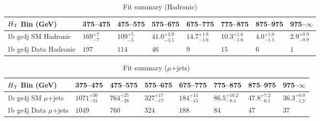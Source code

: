 \documentclass[8pt]{article}
\def\scalht{\mbox{$H_{\rm{T}}$}\xspace}
\newcommand\T{\rule{0pt}{2.6ex}}
\begin{document}
\begin{table}[ht!]
\caption{Fit summary (Hadronic)}
\label{tab:ensemble-summary}
\centering
\begin{tabular}{ llllllll }

\hline
\scalht Bin (GeV)       & 375--475                       & 475--575                       & 575--675                       & 675--775                       & 775--875                       & 875--975                       & 975--$\infty$                  \\ [1.000000ex]
\hline
1b ge4j SM Hadronic\T   & $169^{+7}_{-7}$                & $109^{+5}_{-5}$                & $41.0^{+3.9}_{-3.5}$           & $14.7^{+1.8}_{-1.6}$           & $10.3^{+1.6}_{-1.6}$           & $4.0^{+1.0}_{-1.1}$            & $2.9^{+0.9}_{-0.9}$            \\ 
1b ge4j Data Hadronic\T & $197$                          & $114$                          & $46$                           & $9$                            & $15$                           & $6$                            & $1$                            \\ 
\hline

\end{tabular}
\end{table}
\begin{table}[ht!]
\caption{Fit summary ($\mu$+jets)}
\label{tab:ensemble-summary}
\centering
\begin{tabular}{ llllllll }

\hline
\scalht Bin (GeV)       & 375--475                       & 475--575                       & 575--675                       & 675--775                       & 775--875                       & 875--975                       & 975--$\infty$                  \\ [1.000000ex]
\hline
1b ge4j SM $\mu$+jets\T & $1071^{+30}_{-31}$             & $764^{+25}_{-28}$              & $327^{+17}_{-17}$              & $184^{+14}_{-13}$              & $86.5^{+10.2}_{-8.4}$          & $47.8^{+7.2}_{-6.1}$           & $36.3^{+6.0}_{-5.7}$           \\ 
1b ge4j Data $\mu$+jets\T & $1049$                         & $760$                          & $324$                          & $188$                          & $84$                           & $47$                           & $37$                           \\ 
\hline

\end{tabular}
\end{table}
\end{document}
